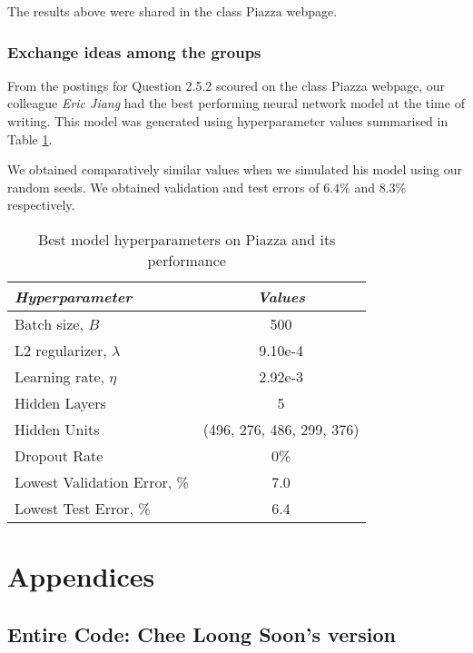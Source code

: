 \documentclass[a4paper,12pt]{article}
\begin{document}
The results above were shared in the class Piazza webpage.

\clearpage
\subsubsection{Exchange ideas among the groups}

From the postings for Question 2.5.2 scoured on the class Piazza webpage, our colleague \textit{Eric Jiang} had the best performing neural network model at the time of writing. This model was generated using hyperparameter values summarised in Table \ref{table:NN_ExchangeIdeas}. 

We obtained comparatively similar values when we simulated his model using our random seeds. We obtained validation and test errors of $6.4\%$ and $8.3\%$ respectively.

\begin{table}[!htb]
\centering
\caption{Best model hyperparameters on Piazza and its performance}
\label{table:NN_ExchangeIdeas}
\vspace{0.5em}
\begin{tabular}{|l|c|} \hline
\textit{Hyperparameter} & \textit{Values} \\ \hline
Batch size, $B$ & 500 \\
L2 regularizer, $\lambda$ & 9.10e-4  \\
Learning rate, $\eta$ & 2.92e-3 \\
Hidden Layers & 5 \\
Hidden Units & (496, 276, 486, 299, 376) \\
Dropout Rate & 0\% \\
\hline
\small{Lowest Validation Error, \%} & 7.0 \\
Lowest Test Error, \% & 6.4 \\
\hline
\end{tabular}
\end{table}

\clearpage
\section{Appendices}
\subsection{Entire Code: Chee Loong Soon's version}
\end{document}
